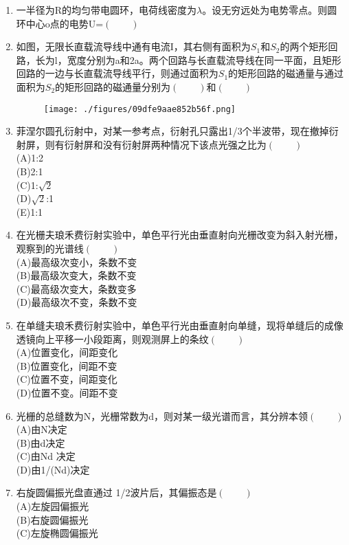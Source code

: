 \begin{enumerate}
\item 一半径为R的均匀带电圆环，电荷线密度为$\lambda$。设无穷远处为电势零点。则圆环中心o点的电势U=$(\qquad)$
\item 如图，无限长直载流导线中通有电流I，其右侧有面积为$S_1$和$S_2$的两个矩形回路，长为l，宽度分别为a和2a。两个回路与长直载流导线在同一平面，且矩形回路的一边与长直载流导线平行，则通过面积为$S_1$的矩形回路的磁通量与通过面积为$S_2$的矩形回路的磁通量分别为$(\qquad)$和$(\qquad)$
\begin{figure}[ht]
\centering
\texttt{[image: ./figures/09dfe9aae852b56f.png]}
\caption{} \label{fig_HDSD13_5}
\end{figure}
\item 菲涅尔圆孔衍射中，对某一参考点，衍射孔只露出1/3个半波带，现在撤掉衍射屏，则有衍射屏和没有衍射屏两种情况下该点光强之比为$(\qquad)$\\
(A)1:2\\
(B)2:1\\
(C)1:$\sqrt{2}$\\
(D)$\sqrt{2}$:1\\
(E)1:1
\item 在光栅夫琅禾费衍射实验中，单色平行光由垂直射向光栅改变为斜入射光栅，观察到的光谱线$(\qquad)$\\
(A)最高级次变小，条数不变\\
(B)最高级次变大，条数不变\\
(C)最高级次变大，条数变多\\
(D)最高级次不变，条数不变
\item 在单缝夫琅禾费衍射实验中，单色平行光由垂直射向单缝，现将单缝后的成像透镜向上平移一小段距离，则观测屏上的条纹$(\qquad)$\\
(A)位置变化，间距变化\\
(B)位置变化，间距不变\\
(C)位置不变，间距变化\\
(D)位置不变。间距不变
\item 光栅的总缝数为N，光栅常数为d，则对某一级光谱而言，其分辨本领$(\qquad)$\\
(A)由N决定\\
(B)由d决定\\
(C)由Nd 决定\\
(D)由1/(Nd)决定
\item 右旋圆偏振光盘直通过 1/2波片后，其偏振态是$(\qquad)$\\
(A)左旋园偏振光\\
(B)右旋圆偏振光\\
(C)左旋椭圆偏振光\\

\end{enumerate}
